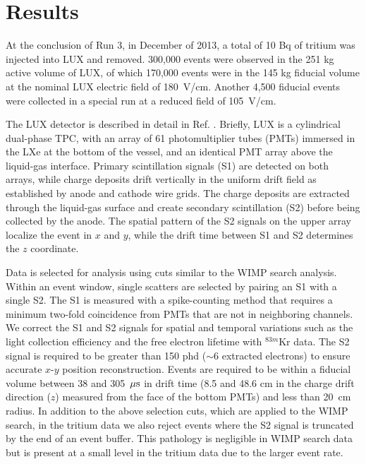 \section{Results}

At the conclusion of Run 3, in December of 2013, a total of 10 Bq of tritium was injected into LUX and removed. 300,000 events were observed in the 251 kg active volume of LUX, of which 170,000 events were in the 145 kg fiducial volume at the nominal LUX electric field of 180~V/cm. Another 4,500 fiducial events were collected in a special run at a reduced field of 105~V/cm. 

The LUX detector is described in detail in Ref. \cite{lux-nim}. Briefly, LUX is a cylindrical dual-phase TPC, with an array of 61 photomultiplier tubes (PMTs) immersed in the LXe at the bottom of the vessel, and an identical PMT array above the liquid-gas interface. Primary scintillation signals (S1) are detected on both arrays, while charge deposits drift vertically in the uniform drift field as established by anode and cathode wire grids. The charge deposits are extracted through the liquid-gas surface and create secondary scintillation (S2) before being collected by the anode. The spatial pattern of the S2 signals on the upper array localize the event in $x$ and $y$, while the drift time between S1 and S2 determines the $z$ coordinate.

Data is selected for analysis using cuts similar to the WIMP search analysis\cite{lux-reanalysis, lux-prd}. Within an event window, single scatters are selected by pairing an S1 with a single S2.  The S1 is measured with a spike-counting method that requires a minimum two-fold coincidence from PMTs that are not in neighboring channels. We correct the S1 and S2 signals for spatial and temporal variations such as the light collection efficiency and the free electron lifetime with $ ^{83m}$Kr data.  The S2 signal is required to be greater than 150 phd ($\sim$6 extracted electrons) to ensure accurate $x$-$y$ position reconstruction. Events are required to be within a fiducial volume between 38 and 305~$\rm \mu s$ in drift time (8.5 and 48.6 cm in the charge drift direction ($z$) measured from the face of the bottom PMTs) and less than 20~cm radius. In addition to the above selection cuts, which are applied to the WIMP search, in the tritium data we also reject events where the S2 signal is truncated by the end of an event buffer. This pathology is negligible in WIMP search data but is present at a small level in the tritium data due to the larger event rate.

